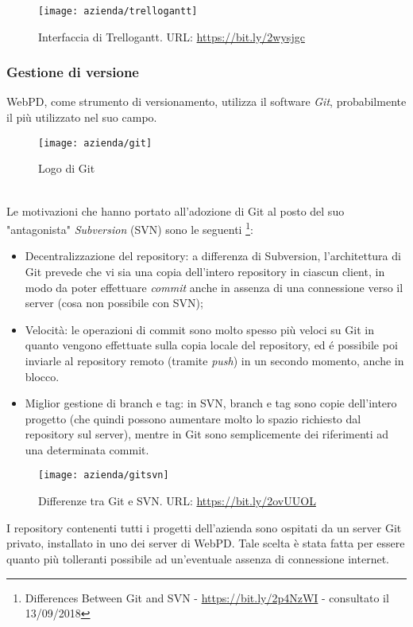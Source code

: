 \begin{figure}[!h] 
	\centering 
	\texttt{[image: azienda/trellogantt]} 
	\caption{Interfaccia di Trellogantt. URL: \url{https://bit.ly/2wysjgc} }
\end{figure}


\subsubsection{Gestione di versione}
WebPD, come strumento di versionamento, utilizza il software \textit{Git}, probabilmente il più utilizzato nel suo campo.\\
\begin{figure}[!h] 
	\centering 
	\texttt{[image: azienda/git]} 
	\caption{Logo di Git }
\end{figure}\\
 Le motivazioni che hanno portato all'adozione di Git al posto del suo "antagonista" \textit{Subversion} (SVN) sono le seguenti \footnote{Differences Between Git and SVN - \url{https://bit.ly/2p4NzWI} - consultato il 13/09/2018}:
\begin{itemize}
	\item Decentralizzazione del repository: a differenza di Subversion, l'architettura di Git prevede che vi sia una copia dell'intero repository in ciascun client, in modo da poter effettuare \textit{commit} anche in assenza di una connessione verso il server (cosa non possibile con SVN);
	\item Velocità: le operazioni di commit sono molto spesso più veloci su Git in quanto vengono effettuate sulla copia locale del repository, ed é possibile poi inviarle al repository remoto (tramite \textit{push}) in un secondo momento, anche in blocco.
	\item Miglior gestione di branch e tag: in SVN, branch e tag sono copie dell'intero progetto (che quindi possono aumentare molto lo spazio richiesto dal repository sul server), mentre in Git sono semplicemente dei riferimenti ad una determinata commit.
\end{itemize}
\begin{figure}[!h] 
	\centering 
	\texttt{[image: azienda/gitsvn]} 
	\caption{Differenze tra Git e SVN. URL: \url{https://bit.ly/2ovUUOL} }
\end{figure}
I repository contenenti tutti i progetti dell'azienda sono ospitati da un server Git privato, installato in uno dei server di WebPD. Tale scelta è stata fatta per essere quanto più tolleranti possibile ad un'eventuale assenza di connessione internet.

